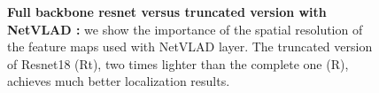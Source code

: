 \begin{figure}
\begin{minipage}{0.65\linewidth}
\begin{minipage}{0.5\linewidth}
		\end{minipage}
	\end{minipage}\hfill
	\begin{minipage}{0.35\linewidth}
		\caption[Importance of feature maps resolution with NetVLAD]{\label{fig:trunc_resnet} \textbf{Full backbone resnet versus truncated version with NetVLAD :} we show the importance of the spatial resolution of the feature maps used with NetVLAD layer. The truncated version of Resnet18 (Rt), two times lighter than the complete one (R), achieves much better localization results.}
	\end{minipage}
\end{figure}